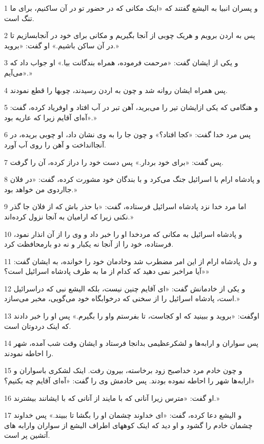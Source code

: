 \par 1 و پسران انبیا به الیشع گفتند که «اینک مکانی که در حضور تو در آن ساکنیم، برای ما تنگ است.
\par 2 پس به اردن برویم و هریک چوبی از آنجا بگیریم و مکانی برای خود در آنجابسازیم تا در آن ساکن باشیم.» او گفت: «بروید.»
\par 3 و یکی از ایشان گفت: «مرحمت فرموده، همراه بندگانت بیا.» او جواب داد که «می‌آیم.»
\par 4 پس همراه ایشان روانه شد و چون به اردن رسیدند، چوبها را قطع نمودند.
\par 5 و هنگامی که یکی ازایشان تیر را می‌برید، آهن تبر در آب افتاد و اوفریاد کرده، گفت: «آه‌ای آقایم زیرا که عاریه بود.»
\par 6 پس مرد خدا گفت: «کجا افتاد؟» و چون جا را به وی نشان داد، او چوبی بریده، در آنجاانداخت و آهن را روی آب آورد.
\par 7 پس گفت: «برای خود بردار.» پس دست خود را دراز کرده، آن را گرفت. 
\par 8 و پادشاه ارام با اسرائیل جنگ می‌کرد و با بندگان خود مشورت کرده، گفت: «در فلان جااردوی من خواهد بود.»
\par 9 اما مرد خدا نزد پادشاه اسرائیل فرستاده، گفت: «با حذر باش که از فلان جا گذر نکنی زیرا که ارامیان به آنجا نزول کرده‌اند.»
\par 10 و پادشاه اسرائیل به مکانی که مردخدا او را خبر داد و وی را از آن انذار نمود، فرستاده، خود را از آنجا نه یکبار و نه دو بارمحافظت کرد.
\par 11 و دل پادشاه ارام از این امر مضطرب شد وخادمان خود را خوانده، به ایشان گفت: «آیا مراخبر نمی دهید که کدام از ما به طرف پادشاه اسرائیل است؟»
\par 12 و یکی از خادمانش گفت: «ای آقایم چنین نیست، بلکه الیشع نبی که دراسرائیل است، پادشاه اسرائیل را از سخنی که درخوابگاه خود می‌گویی، مخبر می‌سازد.»
\par 13 اوگفت: «بروید و ببینید که او کجاست، تا بفرستم واو را بگیرم.» پس او را خبر دادند که اینک دردوتان است.
\par 14 پس سواران و ارابه‌ها و لشکرعظیمی بدانجا فرستاد و ایشان وقت شب آمده، شهر را احاطه نمودند.
\par 15 و چون خادم مرد خداصبح زود برخاسته، بیرون رفت. اینک لشکری باسواران و ارابه‌ها شهر را احاطه نموده بودند. پس خادمش وی را گفت: «آه‌ای آقایم چه بکنیم؟»
\par 16 او گفت: «مترس زیرا آنانی که با مایند از آنانی که با ایشانند بیشترند.»
\par 17 و الیشع دعا کرده، گفت: «ای خداوند چشمان او را بگشا تا ببیند.» پس خداوند چشمان خادم را گشود و او دید که اینک کوههای اطراف الیشع از سواران وارابه های آتشین پر است.
